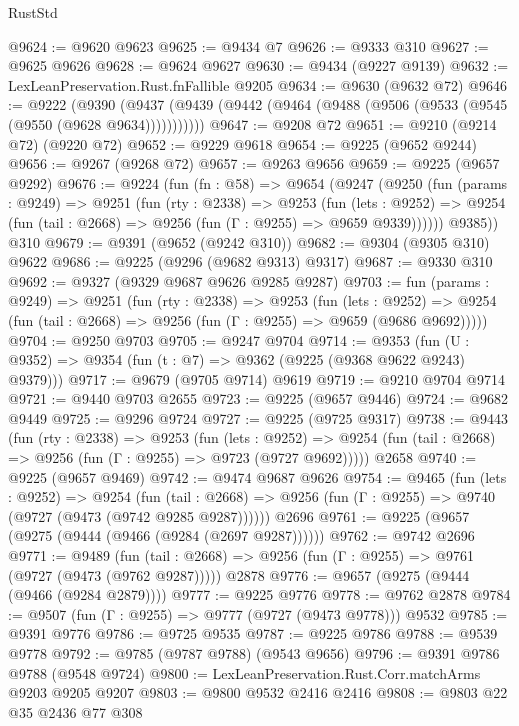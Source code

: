 \begin{lexlean}{RustStd}
\begin{coremodule}
@9624 := @9620 @9623
@9625 := @9434 @7
@9626 := @9333 @310
@9627 := @9625 @9626
@9628 := @9624 @9627
@9630 := @9434 (@9227 @9139)
@9632 := LexLeanPreservation.Rust.fnFallible @9205
@9634 := @9630 (@9632 @72)
@9646 := @9222
    (@9390 (@9437 (@9439 (@9442 (@9464 (@9488 (@9506 (@9533 (@9545 (@9550 (@9628 @9634)))))))))))
@9647 := @9208 @72
@9651 := @9210 (@9214 @72) (@9220 @72)
@9652 := @9229 @9618
@9654 := @9225 (@9652 @9244)
@9656 := @9267 (@9268 @72)
@9657 := @9263 @9656
@9659 := @9225 (@9657 @9292)
@9676 := @9224
    (fun (fn : @58) =>
    @9654
      (@9247
        (@9250
          (fun (params : @9249) =>
          @9251
            (fun (rty : @2338) =>
            @9253
              (fun (lets : @9252) =>
              @9254 (fun (tail : @2668) => @9256 (fun (Γ : @9255) => @9659 @9339))))))
        @9385))
    @310
@9679 := @9391 (@9652 (@9242 @310))
@9682 := @9304 (@9305 @310) @9622
@9686 := @9225 (@9296 (@9682 @9313) @9317)
@9687 := @9330 @310
@9692 := @9327 (@9329 @9687 @9626 @9285 @9287)
@9703 := fun (params : @9249) =>
  @9251
    (fun (rty : @2338) =>
    @9253
      (fun (lets : @9252) =>
      @9254 (fun (tail : @2668) => @9256 (fun (Γ : @9255) => @9659 (@9686 @9692)))))
@9704 := @9250 @9703
@9705 := @9247 @9704
@9714 := @9353 (fun (U : @9352) => @9354 (fun (t : @7) => @9362 (@9225 (@9368 @9622 @9243) @9379)))
@9717 := @9679 (@9705 @9714) @9619
@9719 := @9210 @9704 @9714
@9721 := @9440 @9703 @2655
@9723 := @9225 (@9657 @9446)
@9724 := @9682 @9449
@9725 := @9296 @9724
@9727 := @9225 (@9725 @9317)
@9738 := @9443
    (fun (rty : @2338) =>
    @9253
      (fun (lets : @9252) =>
      @9254 (fun (tail : @2668) => @9256 (fun (Γ : @9255) => @9723 (@9727 @9692)))))
    @2658
@9740 := @9225 (@9657 @9469)
@9742 := @9474 @9687 @9626
@9754 := @9465
    (fun (lets : @9252) =>
    @9254
      (fun (tail : @2668) => @9256 (fun (Γ : @9255) => @9740 (@9727 (@9473 (@9742 @9285 @9287))))))
    @2696
@9761 := @9225 (@9657 (@9275 (@9444 (@9466 (@9284 (@2697 @9287))))))
@9762 := @9742 @2696
@9771 := @9489
    (fun (tail : @2668) => @9256 (fun (Γ : @9255) => @9761 (@9727 (@9473 (@9762 @9287)))))
    @2878
@9776 := @9657 (@9275 (@9444 (@9466 (@9284 @2879))))
@9777 := @9225 @9776
@9778 := @9762 @2878
@9784 := @9507 (fun (Γ : @9255) => @9777 (@9727 (@9473 @9778))) @9532
@9785 := @9391 @9776
@9786 := @9725 @9535
@9787 := @9225 @9786
@9788 := @9539 @9778
@9792 := @9785 (@9787 @9788) (@9543 @9656)
@9796 := @9391 @9786 @9788 (@9548 @9724)
@9800 := LexLeanPreservation.Rust.Corr.matchArms @9203 @9205 @9207
@9803 := @9800 @9532 @2416 @2416
@9808 := @9803 @22 @35 @2436 @77 @308

\end{coremodule}
\end{lexlean}
